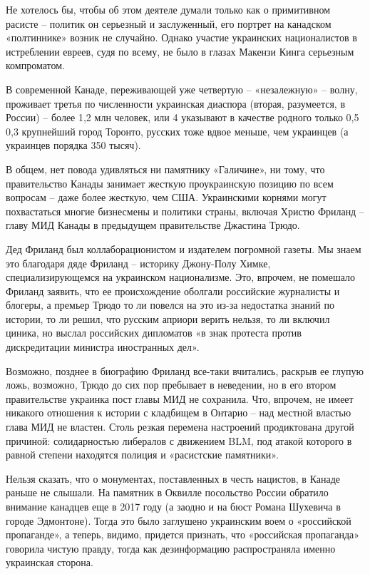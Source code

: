 Не хотелось бы, чтобы об этом деятеле думали только как о примитивном расисте –
политик он серьезный и заслуженный, его портрет на канадском «полтиннике»
возник не случайно. Однако участие украинских националистов в истреблении
евреев, судя по всему, не было в глазах Макензи Кинга серьезным компроматом.

В современной Канаде, переживающей уже четвертую – «незалежную» – волну,
проживает третья по численности украинская диаспора (вторая, разумеется, в
России) – более 1,2 млн человек, или 4%
указывают в качестве родного только 0,5%
0,3%
крупнейший город Торонто, русских тоже вдвое меньше, чем украинцев (а украинцев
порядка 350 тысяч).

В общем, нет повода удивляться ни памятнику «Галичине», ни тому, что
правительство Канады занимает жесткую проукраинскую позицию по всем вопросам –
даже более жесткую, чем США. Украинскими корнями могут похвастаться многие
бизнесмены и политики страны, включая Христю Фриланд – главу МИД Канады в
предыдущем правительстве Джастина Трюдо.

Дед Фриланд был коллаборационистом и издателем погромной газеты. Мы знаем это
благодаря дяде Фриланд – историку Джону-Полу Химке, специализирующемся на
украинском национализме. Это, впрочем, не помешало Фриланд заявить, что ее
происхождение оболгали российские журналисты и блогеры, а премьер Трюдо то ли
повелся на это из-за недостатка знаний по истории, то ли решил, что русским
априори верить нельзя, то ли включил циника, но выслал российских дипломатов «в
знак протеста против дискредитации министра иностранных дел».

Возможно, позднее в биографию Фриланд все-таки вчитались, раскрыв ее глупую
ложь, возможно, Трюдо до сих пор пребывает в неведении, но в его втором
правительстве украинка пост главы МИД не сохранила. Что, впрочем, не имеет
никакого отношения к истории с кладбищем в Онтарио – над местной властью глава
МИД не властен. Столь резкая перемена настроений продиктована другой причиной:
солидарностью либералов с движением BLM, под атакой которого в равной степени
находятся полиция и «расистские памятники».

Нельзя сказать, что о монументах, поставленных в честь нацистов, в Канаде
раньше не слышали. На памятник в Оквилле посольство России обратило внимание
канадцев еще в 2017 году (а заодно и на бюст Романа Шухевича в городе
Эдмонтоне). Тогда это было заглушено украинским воем о «российской пропаганде»,
а теперь, видимо, придется признать, что «российская пропаганда» говорила
чистую правду, тогда как дезинформацию распространяла именно украинская
сторона.

